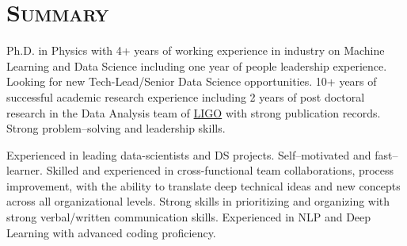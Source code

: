 \documentclass[10pt,a4paper]{moderncv}
\begin{document}
\maketitle


\section{\textsc{Summary}}

Ph.D. in Physics with 4+ years of working experience in industry on Machine Learning and Data Science including one year of people leadership experience. Looking for new Tech-Lead/Senior Data Science opportunities. 10+ years of successful academic research experience including 2 years of post doctoral research in the Data Analysis team of \href{http://www.ligo.org}{LIGO} with strong publication records. Strong problem–solving and leadership skills.
\vspace{0.2cm}

Experienced in leading data-scientists and DS projects. Self–motivated and fast–learner. Skilled and experienced in cross-functional team collaborations, process improvement, with the ability to translate deep technical ideas and new concepts across all organizational levels. Strong skills in prioritizing and organizing with strong verbal/written communication skills. Experienced in NLP and Deep Learning with advanced coding proficiency.
\end{document}
